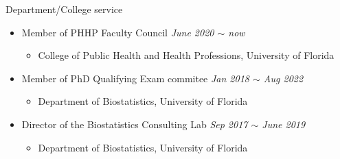 \documentclass{resume} %
\begin{document}
\begin{rSection}{Department/College service}
\begin{itemize}[noitemsep,topsep=0pt]

\item Member of PHHP Faculty Council
        \hfill {\em June 2020 $\sim$ now} 
        \begin{itemize}
        \item College of Public Health and Health Professions, University of Florida
        \end{itemize}

\item Member of PhD Qualifying Exam commitee 
        \hfill {\em Jan 2018 $\sim$ Aug 2022} 
        \begin{itemize}
        \item Department of Biostatistics, University of Florida
        \end{itemize}

\item Director of the Biostatistics Consulting Lab
        \hfill {\em Sep 2017 $\sim$ June 2019} 
        \begin{itemize}
        \item Department of Biostatistics, University of Florida
        \end{itemize}


\end{itemize}
\end{rSection}
\end{document}

